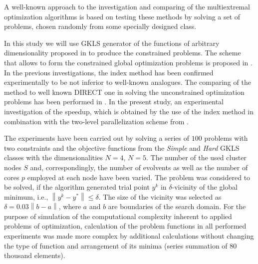 \documentclass[smallextended]{svjour3}       %
\begin{document}
A well-known approach to the investigation and comparing of the multiextremal optimization algorithms is based on testing these methods by solving a set of problems, chosen randomly from some specially designed class.


In this study we will use GKLS generator of the functions of arbitrary dimensionality proposed in \cite{Gaviano2003} to produce the constrained problems. The scheme that allows to form the constrained global optimization problems is proposed in \cite{Gergel2017}. In the previous investigations, the index method has been confirmed experimentally to be not inferior to well-known analogues. The comparing of the method to well known DIRECT one \cite{Jones2001} in solving the unconstrained optimization problems has been performed in \cite{Barkalov2015,Barkalov2016}. In the present study, an experimental investigation of the speedup, which is obtained by the use of the index method in combination with the two-level parallelization scheme from \cite{Sidorov2015}.

The experiments have been carried out by solving a series of $100$ problems with two constraints and the objective functions from the \textit{Simple} and \textit{Hard} GKLS classes with the dimensionalities $N=4$, $N=5$. The number of the used cluster nodes $S$ and, correspondingly, the number of evolvents as well as the number of cores $p$ employed at each node have been varied. The problem was considered to be solved, if the algorithm generated trial point $y^k$ in $\delta$-vicinity of the global minimum, i.e., $\left\|y^k-y^*\right\|\leq \delta$. The size of the vicinity was selected as $\delta=0.03\left\|b-a\right\|$, where $a$ and $b$ are boundaries of the search domain. For the purpose of simulation of the computational complexity inherent to applied problems of optimization, calculation of the problem functions in all performed experiments was made more complex by additional calculations without changing the type of function and arrangement of its minima (series summation of $80$ thousand elements).
\end{document}
